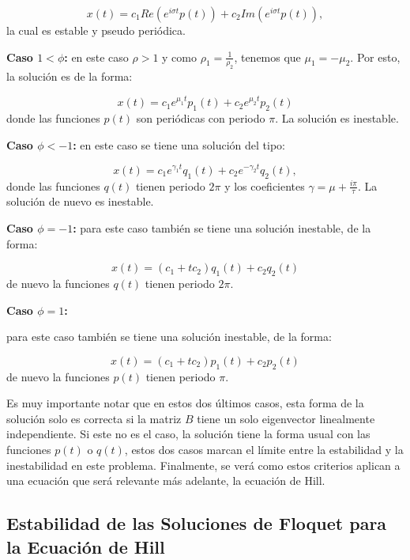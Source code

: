 \documentclass[a4paper,10pt]{report}
\begin{document}
\begin{equation}
x(t) = c_1 Re(e^{i\sigma t} p(t)) + c_2 Im(e^{i\sigma t} p(t)),
\end{equation} la cual es estable y pseudo periódica.

\textbf{Caso $1 < \phi$:} en este caso $\rho > 1$ y como $\rho_1 = \frac{1}{\rho_2}$, tenemos que $\mu_1 = -\mu_2$. Por esto, la solución es de la forma:

\begin{equation}
x(t) = c_1 e^{\mu_1 t}p_1(t) + c_2 e^{\mu_2 t}p_2(t)
\end{equation} donde las funciones $p(t)$ son periódicas con periodo $\pi$. La solución es inestable.

\textbf{Caso $\phi < -1$:} en este caso se tiene una solución del tipo:

\begin{equation}
x(t) =c_1 e^{\gamma_1 t}q_1(t) + c_2 e^{-\gamma_2 t}q_2(t),
\end{equation} donde las funciones $q(t)$ tienen periodo $2\pi$ y los coeficientes $\gamma = \mu + \frac{i\pi}{\tau}$. La solución de nuevo es inestable.

\textbf{Caso $\phi = -1$:} para este caso también se tiene una solución inestable, de la forma:

\begin{equation}
x(t) = (c_1 + tc_2)q_1(t) + c_2q_2(t)
\end{equation} de nuevo la funciones $q(t)$ tienen periodo $2\pi$.

\textbf{Caso $\phi = 1$:}

para este caso también se tiene una solución inestable, de la forma:

\begin{equation}
x(t) = (c_1 + tc_2)p_1(t) + c_2p_2(t)
\end{equation} de nuevo la funciones $p(t)$ tienen periodo $\pi$.

Es muy importante notar que en estos dos últimos casos, esta forma de la solución solo es correcta si la matriz $B$ tiene un solo eigenvector linealmente independiente. Si este no es el caso, la solución tiene la forma usual con las funciones $p(t)$ o $q(t)$, estos dos casos marcan el límite entre la estabilidad y la inestabilidad en este problema. Finalmente, se verá como estos criterios aplican a una ecuación que será relevante más adelante, la ecuación de Hill.

\subsection{Estabilidad de las Soluciones de Floquet para la Ecuación de Hill}
\end{document}

